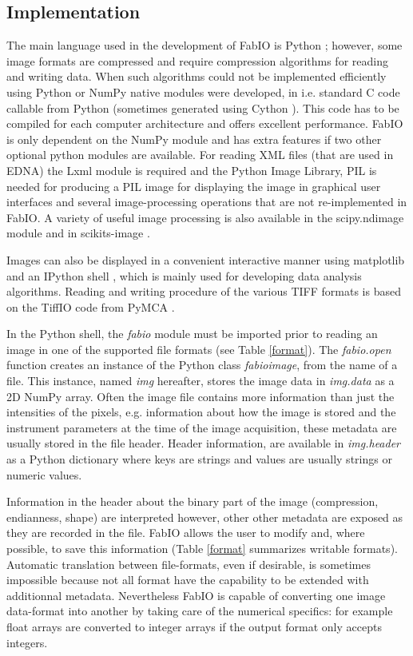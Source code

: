 \documentclass[preprint]{iucr}
\begin{document}
\subsection{Implementation}
The main language used in the development of FabIO is Python \cite{python};
however, some image formats are compressed and require
compression algorithms for reading and writing data. 
When such algorithms could not be implemented efficiently using Python or NumPy
native modules were developed, in i.e. standard C code callable from Python
(sometimes generated using Cython \cite{cython}).
This code has to be compiled for each computer architecture and offers 
excellent performance.
FabIO is only dependent on the NumPy module and has extra features if two other
optional python modules are available. 
For reading XML files (that are used in EDNA) the Lxml  module \cite{lxml} is
required and the Python Image Library, PIL \cite{pil} is needed for producing 
a PIL image for displaying the image in graphical user interfaces and several 
image-processing operations that are not re-implemented in FabIO.
A variety of useful image processing is also available in the scipy.ndimage 
module \cite{scipy} and in scikits-image \cite{skimage}.

Images can also be displayed in a convenient interactive manner using
matplotlib \cite{matplotlib} and an IPython shell \cite{ipython}, which is
mainly used for developing data analysis algorithms.
Reading and writing procedure of the various TIFF \cite{tiff} formats is based
on the TiffIO code from PyMCA \cite{pymca}.

In the Python shell, the {\em fabio} module must be imported prior to reading an
image in one of the supported file formats (see Table \ref{format}).
The {\em fabio.open} function creates an instance of the Python class {\em fabioimage},
from the name of a file. This instance, named {\em img} hereafter, stores the
image data in {\em img.data} as a 2D NumPy array. Often the image file contains
more information than just the intensities of the pixels, e.g.
information about how the image is stored and the instrument parameters at the
time of the image acquisition, these metadata are usually stored in
the file header.
Header information, are available in {\em img.header} as a Python
dictionary where keys are strings and values are usually strings or
numeric values.

Information in the header about the binary part of the image (compression,
endianness, shape) are interpreted however, other other metadata are exposed as
they are recorded in the file. FabIO allows the user to modify
and, where possible, to save this information (Table \ref{format} summarizes
writable formats).
Automatic translation between file-formats, even if desirable, is sometimes
impossible because not all format have the capability to be extended with
additionnal metadata. 
Nevertheless FabIO is capable of converting one
image data-format into another by taking care of the numerical specifics: 
for example float arrays are converted to integer arrays if the output format only
accepts integers.
\end{document}
